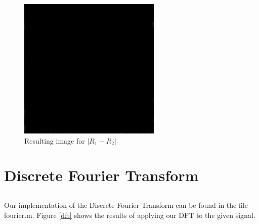 \documentclass{article}
\begin{document}
\begin{figure}[H]
  \begin{center}
    \includegraphics[width=\textwidth]{./images/imDiff.png}
    \caption{Resulting image for $\left|R_1 - R_2\right|$}
    \label{lenaDiff}
  \end{center}
\end{figure}

\clearpage
\section{Discrete Fourier Transform}
\subsection{}
Our implementation of the Discrete Fourier Transform can be found in the file fourier.m. Figure \ref{dft} shows the results of applying our DFT to the given signal.
\end{document}

